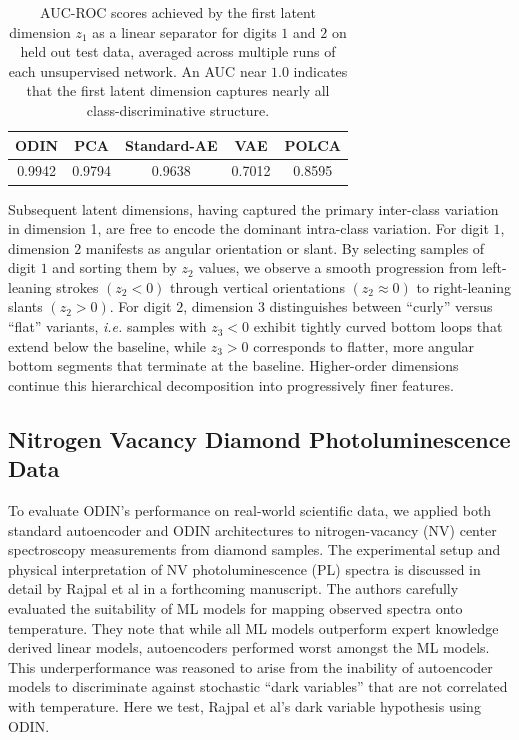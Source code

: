 \documentclass[twoside,11pt]{article}
\begin{document}
\begin{table}[h!]
\centering
\begin{tabular}{|c|c|c|c|c|} 
 \hline
 ODIN & PCA & Standard-AE & VAE & POLCA\\ [0.5ex] 
 \hline
 0.9942 & 0.9794 &  0.9638 & 0.7012 & 0.8595\\ 
 [1ex] 
 \hline
\end{tabular}
\caption{AUC-ROC scores achieved by the first latent dimension $z_1$ as a linear separator for digits $1$ and $2$ on held out test data, averaged across multiple runs of each unsupervised network. An AUC near $1.0$ indicates that the first latent dimension captures nearly all class-discriminative structure.}
\label{table:AUC_score}
\end{table}

Subsequent latent dimensions, having captured the primary inter-class variation in dimension 1, are free to encode the dominant intra-class variation. For digit $1$, dimension $2$ manifests as angular orientation or slant. By selecting samples of digit $1$ and sorting them by $z_2$ values, we observe a smooth progression from left-leaning strokes $(z_2<0)$ through vertical orientations $(z_2 \approx 0)$ to right-leaning slants $(z_2>0)$. For digit $2$, dimension $3$ distinguishes between ``curly'' versus ``flat'' variants, \emph{i.e.} samples with $z_3<0$ exhibit tightly curved bottom loops that extend below the baseline, while $z_3>0$ corresponds to flatter, more angular bottom segments that terminate at the baseline. Higher-order dimensions continue this hierarchical decomposition into progressively finer features. 



\subsection{Nitrogen Vacancy Diamond Photoluminescence Data}
To evaluate ODIN's performance on real-world scientific data, we applied both standard autoencoder and ODIN architectures to nitrogen-vacancy (NV) center spectroscopy measurements from diamond samples. The experimental setup and physical interpretation of NV photoluminescence (PL) spectra is discussed in detail by Rajpal et al \cite{rajpal_PL} in a forthcoming manuscript. The authors carefully evaluated the suitability of ML models for mapping observed spectra onto temperature. They note that while all ML models outperform expert knowledge derived linear models, autoencoders performed worst amongst the ML models. This underperformance was reasoned to arise from the inability of autoencoder models to discriminate against stochastic ``dark variables'' that are not correlated with temperature. Here we test, Rajpal et al's \cite{rajpal_PL}dark variable hypothesis using ODIN. 
\end{document}
